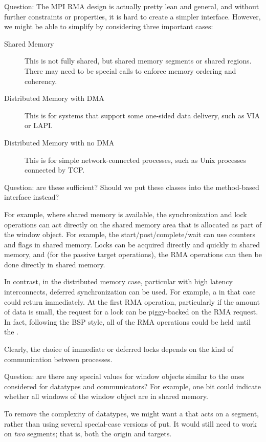 \documentclass{article}
\begin{document}
Question: The MPI RMA design is actually pretty lean and general, and
without further constraints or properties, it is hard to create a
simpler interface.  However, we might be able to simplify by
considering three important cases:
\begin{description}
\item[Shared Memory]This is not fully shared, but shared memory
segments or shared  regions. There may need to be special
calls to enforce memory ordering and coherency.
\item[Distributed Memory with DMA]This is for systems that support
some one-sided data delivery, such as VIA or LAPI.
\item[Distributed Memory with no DMA]This is for simple
network-connected processes, such as Unix processes connected by TCP.
\end{description}
Question: are these sufficient?  Should we put these classes into the
method-based interface instead?

For example, where shared memory is available, the synchronization and
lock operations can act directly on the shared memory area that is
allocated as part of the window object.  For example, the
start/post/complete/wait can use counters and flags in shared memory.
Locks can be acquired directly and quickly in shared memory, and (for
the passive target operations), the RMA operations can then be done
directly in shared memory.

In contrast, in the distributed memory case, particular with high
latency interconnects, deferred synchronization can be used.  For
example, a  in that case could return immediately.
At the first RMA operation, particularly if the amount of data is
small, the request for a lock can be piggy-backed on the RMA request.
In fact, following the BSP style, all of the RMA operations could be
held until the .

Clearly, the choice of immediate or deferred locks depends on the kind
of communication between processes.

Question: are there any special values for window objects similar to the ones
considered for datatypes and communicators?  For example, one bit could
indicate whether all windows of the window object are in shared memory.

To remove the complexity of datatypes, we might want a
 that acts on a segment, rather than using several
special-case versions of put.  It would still need to work on \emph{two}
segments; that is, both the origin and targets.
\end{document}
